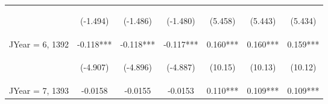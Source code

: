 \documentclass[]{article}
\begin{document}
\begin{center}
\begin{tabular}{lcccccc}
        \vspace{4pt}     & \begin{footnotesize}(-1.494)\end{footnotesize} & \begin{footnotesize}(-1.486)\end{footnotesize} & \begin{footnotesize}(-1.480)\end{footnotesize} & \begin{footnotesize}(5.458)\end{footnotesize}  & \begin{footnotesize}(5.443)\end{footnotesize}  & \begin{footnotesize}(5.434)\end{footnotesize}  \\
        JYear = 6, 1392  & -0.118***                                      & -0.118***                                      & -0.117***                                      & 0.160***                                       & 0.160***                                       & 0.159***                                       \\
        \vspace{4pt}     & \begin{footnotesize}(-4.907)\end{footnotesize} & \begin{footnotesize}(-4.896)\end{footnotesize} & \begin{footnotesize}(-4.887)\end{footnotesize} & \begin{footnotesize}(10.15)\end{footnotesize}  & \begin{footnotesize}(10.13)\end{footnotesize}  & \begin{footnotesize}(10.12)\end{footnotesize}  \\
        JYear = 7, 1393  & -0.0158                                        & -0.0155                                        & -0.0153                                        & 0.110***                                       & 0.109***                                       & 0.109***                                       \\

\end{tabular}
\end{center}
\end{document}
